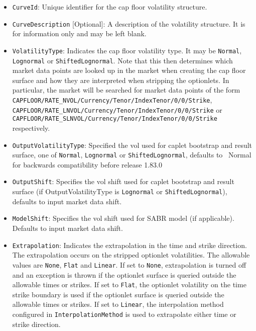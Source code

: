 \begin{itemize}
\item
\lstinline!CurveId!: Unique identifier for the cap floor volatility structure.

\item \lstinline!CurveDescription! [Optional]:
A description of the volatility structure. It is for information only and may be left blank.

\item \lstinline!VolatilityType!:
Indicates the cap floor volatility type. It may be \lstinline!Normal!, \lstinline!Lognormal! or \lstinline!ShiftedLognormal!. Note that this then determines which market data points are looked up in the market when creating the cap floor surface and how they are interpreted when stripping the optionlets. In particular, the market will be searched for market data points of the form \lstinline!CAPFLOOR/RATE_NVOL/Currency/Tenor/IndexTenor/0/0/Strike!, \lstinline!CAPFLOOR/RATE_LNVOL/Currency/Tenor/IndexTenor/0/0/Strike! or \lstinline!CAPFLOOR/RATE_SLNVOL/Currency/Tenor/IndexTenor/0/0/Strike! respectively.

\item \lstinline!OutputVolatilityType!: Specified the vol used for caplet bootstrap and result surface, one of {\tt Normal},
  {\tt Lognormal} or {\tt ShiftedLognormal}, defaults to {\ Normal} for backwards compatibility before release 1.83.0

\item \lstinline!OutputShift!: Specifies the vol shift used for caplet bootstrap and result surface (if OutputVolatilityType is 
{\tt Lognormal} or {\tt ShiftedLognormal}), defaults to input market data shift. 

\item \lstinline!ModelShift!: Specifies the vol shift used for SABR model (if applicable). Defaults to input market data shift. 

\item \lstinline!Extrapolation!:
Indicates the extrapolation in the time and strike direction. The extrapolation occurs on the stripped optionlet volatilities. The allowable values are \lstinline!None!, \lstinline!Flat! and \lstinline!Linear!. If set to \lstinline!None!, extrapolation is turned off and an exception is thrown if the optionlet surface is queried outside the allowable times or strikes. If set to \lstinline!Flat!, the optionlet volatility on the time strike boundary is used if the optionlet surface is queried outside the allowable times or strikes. If set to \lstinline!Linear!, the interpolation method configured in \lstinline!InterpolationMethod! is used to extrapolate either time or strike direction.


\end{itemize}
